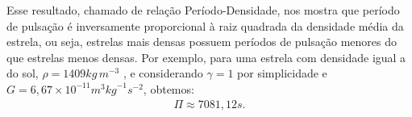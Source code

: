 Esse resultado, chamado de relação Período-Densidade, nos mostra que período de pulsação é inversamente proporcional à raiz quadrada da densidade média da estrela, ou seja, estrelas mais densas possuem períodos de pulsação menores do que estrelas menos densas. Por exemplo, para uma estrela com densidade igual a do sol, $\rho = 1409 \si{kg} \, \si{m}^{-3}$ \citep{keplerLivro2013}, e considerando $\gamma = 1$ por simplicidade e $G= 6,67 \times 10^{-11} \si{m}^3 \si{kg}^{-1} \si{s}^{-2}$, obtemos:
\begin{align}
\Pi \approx  7081,12 \si{s}.
\end{align}

